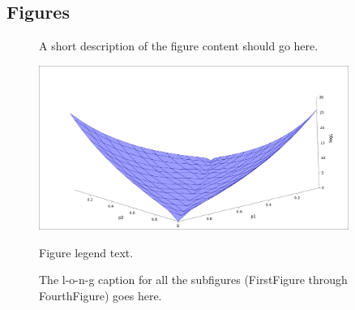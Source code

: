 \documentclass{bmcart}
\begin{document}
\begin{backmatter}


\section*{Figures}
  \begin{figure}[h!]
  \caption{
      A short description of the figure content
      should go here.}
      \end{figure}

\begin{figure}[h!]
  \caption{
      Figure legend text.}
    \includegraphics[width=0.9\textwidth]{DiffTest.png}
    \label{fig:difftest}
      \end{figure}

\begin{figure}[ht!]
\begin{center}



\end{center}
\caption{ 
The l-o-n-g caption for all the subfigures
(FirstFigure through FourthFigure) goes here.
}
\label{fig:subfigures}
\end{figure}


\end{backmatter}
\end{document}
